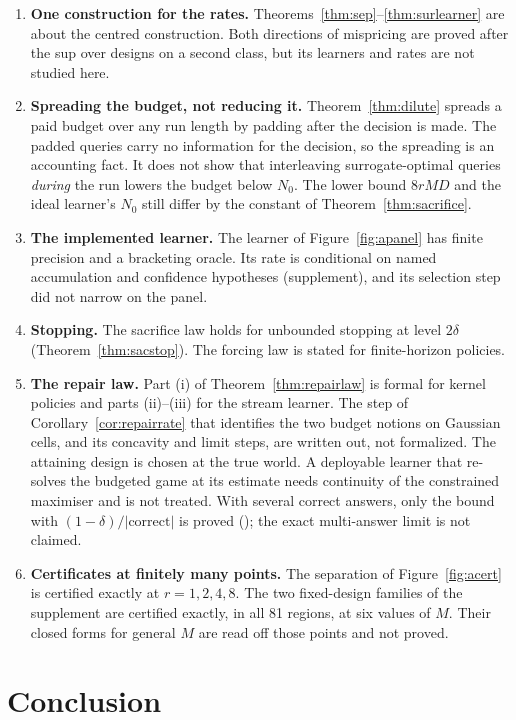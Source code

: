 \begin{enumerate}
\item[1)] \textbf{One construction for the rates.} Theorems~\ref{thm:sep}--\ref{thm:surlearner}
are about the centred construction. Both directions of mispricing are proved after the sup over
designs on a second class, but its learners and rates are not studied here.
\item[2)] \textbf{Spreading the budget, not reducing it.} Theorem~\ref{thm:dilute} spreads a
paid budget over any run length by padding after the decision is made. The padded queries carry
no information for the decision, so the spreading is an accounting fact. It does not show that
interleaving surrogate-optimal queries \emph{during} the run lowers the budget below $N_{0}$.
The lower bound $8rMD$ and the ideal learner's $N_{0}$ still differ by the constant of
Theorem~\ref{thm:sacrifice}.
\item[3)] \textbf{The implemented learner.} The learner of Figure~\ref{fig:apanel} has finite
precision and a bracketing oracle. Its rate is conditional on named accumulation and
confidence hypotheses (supplement), and its selection step did not narrow on the panel.
\item[4)] \textbf{Stopping.} The sacrifice law holds for unbounded stopping at level $2\delta$
(Theorem~\ref{thm:sacstop}). The forcing law is stated for finite-horizon policies.
\item[5)] \textbf{The repair law.} Part (i) of Theorem~\ref{thm:repairlaw} is formal for kernel
policies and parts (ii)--(iii) for the stream learner. The step of
Corollary~\ref{cor:repairrate} that identifies the two budget notions on Gaussian cells, and its
concavity and limit steps, are written out, not formalized. The attaining design is chosen at
the true world. A deployable learner that re-solves the budgeted game at its estimate needs
continuity of the constrained maximiser and is not treated. With several correct answers, only
the bound with $(1-\delta)/|\text{correct}|$ is proved (); the exact
multi-answer limit is not claimed.
\item[6)] \textbf{Certificates at finitely many points.} The separation of
Figure~\ref{fig:acert} is certified exactly at $r=1,2,4,8$. The two fixed-design families of the
supplement are certified exactly, in all 81 regions, at six values of $M$. Their closed forms for
general $M$ are read off those points and not proved.
\end{enumerate}

\section{Conclusion}

